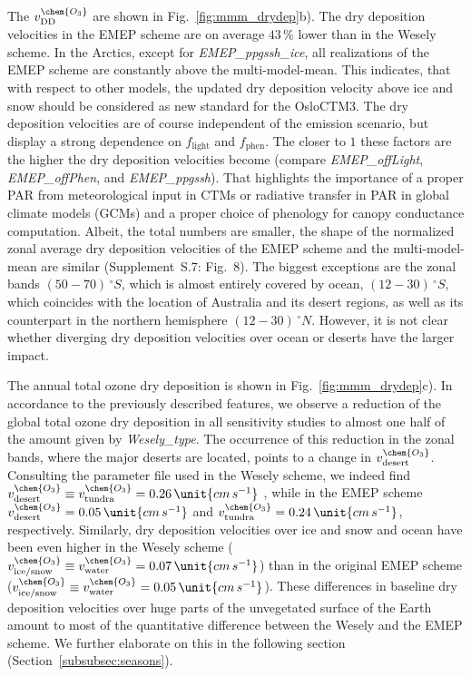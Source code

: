 \documentclass[gmd, manuscript]{copernicus}
\begin{document}
The $v^\chem{O_3}_\text{DD}$ are shown in Fig.~\ref{fig:mmm_drydep}b). The dry deposition velocities in the EMEP scheme are on average $43\,\unit{\%}$ lower than in the Wesely scheme. In the Arctics, except for \emph{EMEP\_ppgssh\_ice}, all realizations of the EMEP scheme are constantly above the multi-model-mean. This indicates, that with respect to other models, the updated dry deposition velocity above ice and snow should be considered as new standard for the OsloCTM3. The dry deposition velocities are of course independent of the emission scenario, but display a strong dependence on $f_\text{light}$ and $f_\text{phen}$. The closer to $1$ these factors are the higher the dry deposition velocities become (compare \emph{EMEP\_offLight}, \emph{EMEP\_offPhen}, and \emph{EMEP\_ppgssh}). That highlights the importance of a proper PAR from meteorological input in CTMs or radiative transfer in PAR in global climate models (GCMs) and a proper choice of phenology for canopy conductance computation. Albeit, the total numbers are smaller, the shape of the normalized zonal average dry deposition velocities of the EMEP scheme and the multi-model-mean are similar (Supplement~S.7: Fig.~8). The biggest exceptions are the zonal bands $(50-70)\,\unit{^\circ S}$, which is almost entirely covered by ocean, $(12-30)\,\unit{^\circ S}$, which coincides with the location of Australia and its desert regions, as well as its counterpart in the northern hemisphere $(12-30)\,\unit{^\circ N}$. However, it is not clear whether diverging dry deposition velocities over ocean or deserts have the larger impact.

The annual total ozone dry deposition is shown in Fig.~\ref{fig:mmm_drydep}c). In accordance to the previously described features, we observe a reduction of the global total ozone dry deposition in all sensitivity studies to almost one half of the amount given by \emph{Wesely\_type}. The occurrence of this reduction in the zonal bands, where the major deserts are located, points to a change in $v_\text{desert}^\chem{O_3}$. Consulting the parameter file used in the Wesely scheme, we indeed find $v_\text{desert}^\chem{O_3} \equiv v_\text{tundra}^\chem{O_3} = 0.26\,\unit{cm\,s^{-1}}$ \citep{JGR:Hough1991}, while in the EMEP scheme $v_\text{desert}^\chem{O_3}=0.05\,\unit{cm\,s^{-1}}$ and $v^\chem{O_3}_\text{tundra} = 0.24\,\unit{cm\,s^{-1}}$, respectively. Similarly, dry deposition velocities over ice and snow and ocean have been even higher in the Wesely scheme ($v_\text{ice/snow}^\chem{O_3}\equiv v_\text{water}^\chem{O_3}=0.07\,\unit{cm\,s^{-1}}$) than in the original EMEP scheme ($v_\text{ice/snow}^\chem{O_3}\equiv v_\text{water}^\chem{O_3}=0.05\,\unit{cm\,s^{-1}}$). These differences in baseline dry deposition velocities over huge parts of the unvegetated surface of the Earth amount to most of the quantitative difference between the Wesely and the EMEP scheme. We further elaborate on this in the following section (Section~\ref{subsubsec:seasons}).
\end{document}

